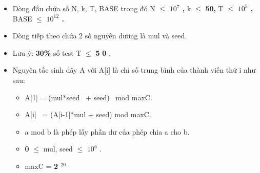 \begin{itemize}
	\item      Dòng đầu chứa số N, k, T, BASE trong đó N  $\le$      \textbf{      $10^{7}$      ,     }     k  $\le$      \textbf{      50,     }     T  $\le$      \textbf{      $10^{5}$      ,     }     BASE  $\le$      \textbf{      $10^{12}$      .     }
	\item      Dòng tiếp theo chứa 2 số nguyên dương là mul và seed.    
	\item      Lưu ý:     \textbf{      30\%     }     số test T  $\le$      \textbf{      5     }\textbf{      0     }     .    
	\item      Nguyên tắc sinh dãy A với A[i] là chỉ số trung bình của thành viến thứ i như sau:    
\begin{itemize}
	\item        A[1] = (mul*seed  + seed)  mod maxC.      
	\item        A[i]  = (A[i-1]*mul + seed) mod maxC.      
	\item        a mod b là phép lấy phần dư của phép chia a cho b.      
	\item \textbf{        0       }        $\le$  mul, seed  $\le$        \textbf{        $10^{6}$}       .      
	\item        maxC =       \textbf{\textbf{         2        }$^         20        $$^         .        $}
\end{itemize}
\end{itemize}